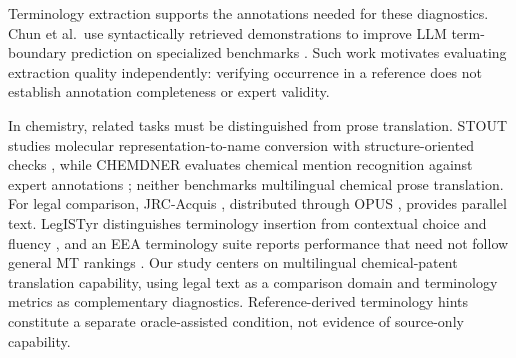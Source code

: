 Terminology extraction supports the annotations needed for these diagnostics. Chun et al.\ use
syntactically retrieved demonstrations to improve LLM term-boundary prediction on specialized
benchmarks \cite{chun2025}. Such work motivates evaluating extraction quality independently:
verifying occurrence in a reference does not establish annotation completeness or expert validity.

In chemistry, related tasks must be distinguished from prose translation. STOUT studies molecular
representation-to-name conversion with structure-oriented checks \cite{rajan2021}, while CHEMDNER
evaluates chemical mention recognition against expert annotations \cite{krallinger2015}; neither
benchmarks multilingual chemical prose translation. For legal comparison, JRC-Acquis
\cite{steinberger2006}, distributed through OPUS \cite{tiedemann2012}, provides parallel text.
LegISTyr distinguishes terminology insertion from contextual choice and fluency \cite{dinatale2025},
and an EEA terminology suite reports performance that need not follow general MT rankings
\cite{hauksdottir2025}. Our study centers on multilingual chemical-patent translation capability,
using legal text as a comparison domain and terminology metrics as complementary diagnostics.
Reference-derived terminology hints constitute a separate oracle-assisted condition, not evidence
of source-only capability.